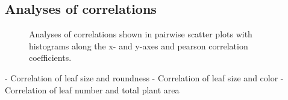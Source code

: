 \documentclass[paper=A4,bibliography=totocnumbered]{scrartcl}
\begin{document}
\subsection{Analyses of correlations}
\begin{figure}
	\centering
	\qquad
	\qquad
	\caption{Analyses of correlations shown in pairwise scatter plots with histograms along the x- and y-axes and pearson correlation coefficients.}
	\label{fig:corr}
\end{figure}

- Correlation of leaf size and roundness
- Correlation of leaf size and color
- Correlation of leaf number and total plant area
\end{document}
